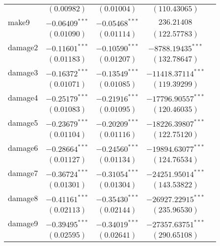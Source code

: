 \begin{table}
\begin{center}
\begin{tabular}{l c c c c}
                 & $(0.00982)$      & $(0.01004)$      & $(110.43065)$        &                 \\
make9            & $-0.06409^{***}$ & $-0.05468^{***}$ & $236.21408$          &                 \\
                 & $(0.01090)$      & $(0.01114)$      & $(122.57783)$        &                 \\
damage2          & $-0.11601^{***}$ & $-0.10590^{***}$ & $-8788.19435^{***}$  &                 \\
                 & $(0.01183)$      & $(0.01207)$      & $(132.78647)$        &                 \\
damage3          & $-0.16372^{***}$ & $-0.13549^{***}$ & $-11418.37114^{***}$ &                 \\
                 & $(0.01071)$      & $(0.01085)$      & $(119.39299)$        &                 \\
damage4          & $-0.25179^{***}$ & $-0.21916^{***}$ & $-17796.90557^{***}$ &                 \\
                 & $(0.01083)$      & $(0.01095)$      & $(120.46035)$        &                 \\
damage5          & $-0.23679^{***}$ & $-0.20209^{***}$ & $-18226.39807^{***}$ &                 \\
                 & $(0.01104)$      & $(0.01116)$      & $(122.75120)$        &                 \\
damage6          & $-0.28664^{***}$ & $-0.24560^{***}$ & $-19894.63077^{***}$ &                 \\
                 & $(0.01127)$      & $(0.01134)$      & $(124.76534)$        &                 \\
damage7          & $-0.36724^{***}$ & $-0.31054^{***}$ & $-24251.95014^{***}$ &                 \\
                 & $(0.01301)$      & $(0.01304)$      & $(143.53822)$        &                 \\
damage8          & $-0.41161^{***}$ & $-0.35430^{***}$ & $-26927.22915^{***}$ &                 \\
                 & $(0.02113)$      & $(0.02144)$      & $(235.96530)$        &                 \\
damage9          & $-0.39495^{***}$ & $-0.34019^{***}$ & $-27357.63751^{***}$ &                 \\
                 & $(0.02595)$      & $(0.02641)$      & $(290.65108)$        &                 \\

\end{tabular}
\end{center}
\end{table}
